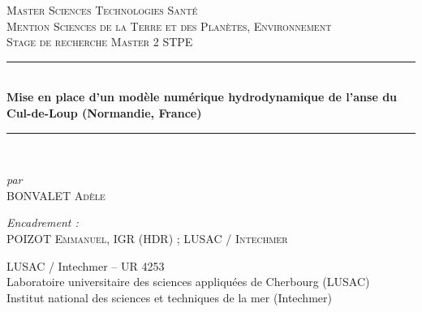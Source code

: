 \documentclass[10pt,a4paper,titlepage]{article}
\newcommand{\HRule}{\rule{\linewidth}{0.5mm}}
\begin{document}
    \begin{titlepage}
        \begin{sffamily}
            \begin{center}


                \textsc{\LARGE Master Sciences Technologies Santé\\
                    Mention Sciences de la Terre et des Planètes, Environnement}\\[2cm]

                \textsc{\Large Stage de recherche Master 2 STPE}\\[1.5cm]

                \HRule \\[0.4cm]
                { \huge \bfseries Mise en place d’un modèle numérique hydrodynamique de l’anse du Cul-de-Loup (Normandie, France)\\ [0.4cm] }

                \HRule \\[2cm]

                \begin{flushleft} \large
                    \centering
                    \emph{par}\\ \textsc{BONVALET Adèle}\\
                \end{flushleft}
                
                \vfill
                
                \begin{flushleft} \large
                    \emph{Encadrement :} \\ \textsc{POIZOT Emmanuel, IGR (HDR) ; LUSAC / Intechmer}\\
                \end{flushleft}
\vspace{0.4cm}
{\large LUSAC / Intechmer  – UR 4253
    \\Laboratoire universitaire des sciences appliquées de Cherbourg (LUSAC)
    \\Institut national des sciences et techniques de la mer (Intechmer)
}
\\[0.4cm]


\end{center}
\end{sffamily}
\end{titlepage}
\end{document}

